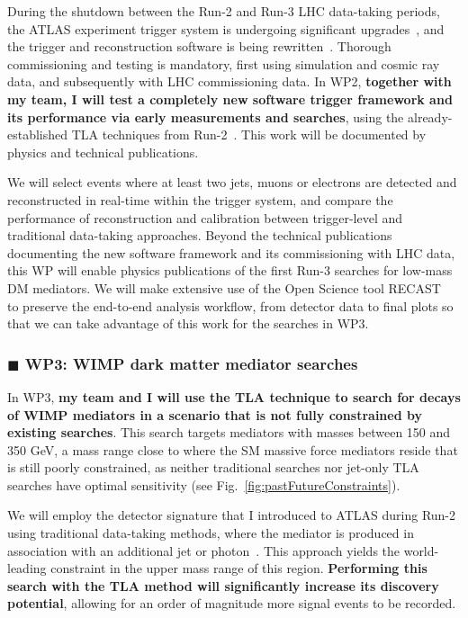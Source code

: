 \documentclass[11pt,a4paper]{article}
\begin{document}
During the shutdown between the Run-2 and Run-3 LHC data-taking periods, the ATLAS experiment trigger system is undergoing significant upgrades~\cite{Aad:2013tqj}, and the trigger and reconstruction software is being rewritten~\cite{Stewart:2016pay}. 
Thorough commissioning and testing is mandatory, first using simulation and cosmic ray data, and subsequently with LHC commissioning data. 
In WP2, \textbf{together with my team, I will test a completely new software trigger framework and its performance via early measurements and searches}, using the already-established TLA techniques from Run-2~\cite{Aaboud:2018fzt}. This work will be documented by physics and technical publications.  

We will select events where at least two jets, muons or electrons are detected and reconstructed in real-time within the trigger system, and compare the performance of reconstruction and calibration between trigger-level and traditional data-taking approaches. 
Beyond the technical publications documenting the new software framework and its commissioning with LHC data, this WP will enable physics publications of the first Run-3 searches for low-mass DM mediators. 
We will make extensive use of the Open Science tool RECAST~\cite{Schuy:2019awp} to preserve the end-to-end analysis workflow, from detector data to final plots so that we can take advantage of this work for the searches in WP3.  

\subsubsection*{\color{yellow} $\blacksquare$ \color{black} WP3: WIMP dark matter mediator searches}

In WP3, \textbf{my team and I will use the TLA technique to search for decays of WIMP mediators in a scenario that is not fully constrained by existing searches}.
This search targets mediators with masses between 150 and 350 GeV, a mass range close to where the SM massive force mediators reside that is still poorly constrained, as neither traditional searches nor jet-only TLA searches have optimal sensitivity (see Fig.~\ref{fig:pastFutureConstraints}).  

We will employ the detector signature that I introduced to ATLAS during Run-2 using traditional data-taking methods, where the mediator is produced in association with an additional jet or photon~\cite{Aaboud:2019zxd}. 
This approach yields the world-leading constraint in the upper mass range of this region. 
\textbf{Performing this search with the TLA method will significantly increase its discovery potential}, 
allowing for an order of magnitude more signal events to be recorded.%
\end{document}
